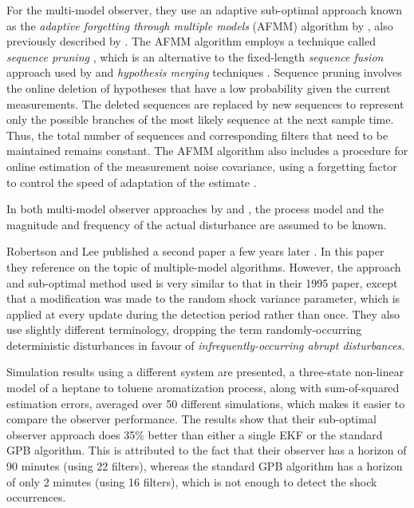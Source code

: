 For the multi-model observer, they use an adaptive sub-optimal approach known as the \textit{adaptive forgetting through multiple models} (AFMM) algorithm by \cite{andersson_adaptive_1985}, also previously described by \cite{gustafsson_estimation_1993}. The AFMM algorithm employs a technique called \textit{sequence pruning} \citep{tugnait_detection_1982}, which is an alternative to the fixed-length \textit{sequence fusion} approach used by \cite{robertson_detection_1995} and \textit{hypothesis merging} techniques \citep{blom_interacting_1988}. Sequence pruning involves the online deletion of hypotheses that have a low probability given the current measurements. The deleted sequences are replaced by new sequences to represent only the possible branches of the most likely sequence at the next sample time. Thus, the total number of sequences and corresponding filters that need to be maintained remains constant. The AFMM algorithm also includes a procedure for online estimation of the measurement noise covariance, using a forgetting factor to control the speed of adaptation of the estimate \citep{andersson_adaptive_1985}.

In both multi-model observer approaches by \cite{eriksson_classification_1996} and \cite{robertson_detection_1995}, the process model and the magnitude and frequency of the actual disturbance are assumed to be known.

Robertson and Lee published a second paper a few years later \citep{robertson_method_1998}. In this paper they reference \cite{andersson_adaptive_1985} on the topic of multiple-model algorithms.  However, the approach and sub-optimal method used is very similar to that in their 1995 paper, except that a modification was made to the random shock variance parameter, which is applied at every update during the detection period rather than once. They also use slightly different terminology, dropping the term randomly-occurring deterministic disturbances in favour of \textit{infrequently-occurring abrupt disturbances}.

Simulation results using a different system are presented, a three-state non-linear model of a heptane to toluene aromatization process, along with sum-of-squared estimation errors, averaged over 50 different simulations, which makes it easier to compare the observer performance. The results show that their sub-optimal observer approach does 35\% better than either a single EKF or the standard GPB algorithm. This is attributed to the fact that their observer has a horizon of 90 minutes (using 22 filters), whereas the standard GPB algorithm has a horizon of only 2 minutes (using 16 filters), which is not enough to detect the shock occurrences.

